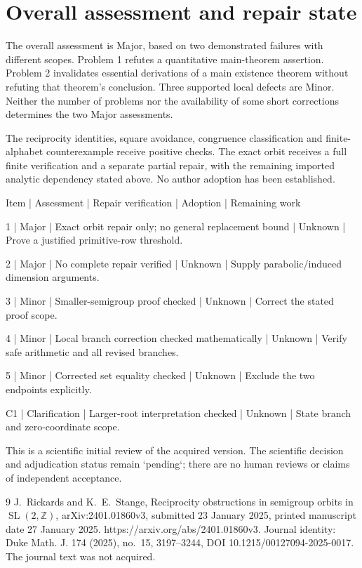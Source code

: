 \documentclass[10pt]{article}
\begin{document}
\section*{Overall assessment and repair state}
The overall assessment is Major, based on two demonstrated failures with different scopes. Problem 1 refutes a quantitative main-theorem assertion. Problem 2 invalidates essential derivations of a main existence theorem without refuting that theorem’s conclusion. Three supported local defects are Minor. Neither the number of problems nor the availability of some short corrections determines the two Major assessments.\par
The reciprocity identities, square avoidance, congruence classification and finite-alphabet counterexample receive positive checks. The exact orbit receives a full finite verification and a separate partial repair, with the remaining imported analytic dependency stated above. No author adoption has been established.\par
Item | Assessment | Repair verification | Adoption | Remaining work\par
1 | Major | Exact orbit repair only; no general replacement bound | Unknown | Prove a justified primitive-row threshold.\par
2 | Major | No complete repair verified | Unknown | Supply parabolic/induced dimension arguments.\par
3 | Minor | Smaller-semigroup proof checked | Unknown | Correct the stated proof scope.\par
4 | Minor | Local branch correction checked mathematically | Unknown | Verify safe arithmetic and all revised branches.\par
5 | Minor | Corrected set equality checked | Unknown | Exclude the two endpoints explicitly.\par
C1 | Clarification | Larger-root interpretation checked | Unknown | State branch and zero-coordinate scope.\par
This is a scientific initial review of the acquired version. The scientific decision and adjudication status remain `pending`; there are no human reviews or claims of independent acceptance.\par
9 J. Rickards and K. E. Stange, Reciprocity obstructions in semigroup orbits in \(\operatorname{SL}(2,\mathbb Z)\), arXiv:2401.01860v3, submitted 23 January 2025, printed manuscript date 27 January 2025. https://arxiv.org/abs/2401.01860v3. Journal identity: Duke Math. J. 174 (2025), no. 15, 3197–3244, DOI 10.1215/00127094-2025-0017. The journal text was not acquired.\par
\end{document}
